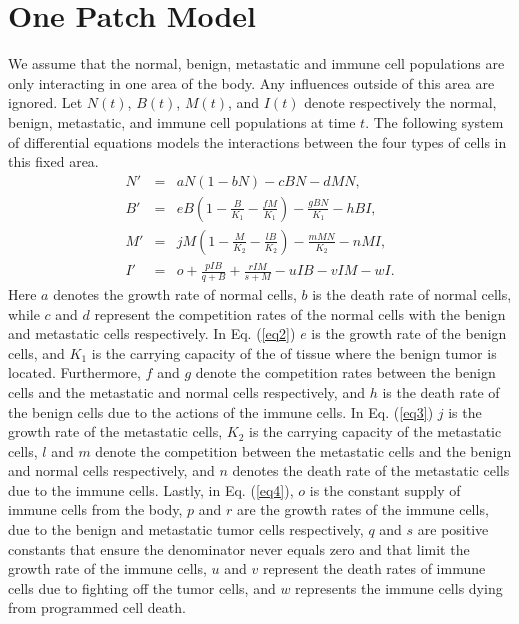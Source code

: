 \documentclass[letter,10pt]{article}
\begin{document}
\section{One Patch Model}
We assume that the normal, benign, metastatic and immune cell populations are only interacting in one area of the body. Any influences outside of this area are ignored. Let $N(t)$, $B(t)$, $M(t)$, and $I(t)$ denote respectively the normal, benign, metastatic, and immune cell populations at time $t$. The following system of differential equations models the interactions between the four types of cells in this fixed area.
\begin{eqnarray}
N'& =& aN(1-bN)-cBN-dMN, \label{eq1}\\
B' &=& eB(1-\frac{B}{K_1}-\frac{fM}{K_1})-\frac{gBN}{K_1}-hBI,\label{eq2}\\
M' &=& jM(1-\frac{M}{K_2}-\frac{lB}{K_2})-\frac{mMN}{K_2}-nMI,\label{eq3}\\
I' &=& o+\frac{pIB}{q+B}+\frac{rIM}{s+M}-uIB-vIM-wI.\label{eq4}
\end{eqnarray}
Here $a$ denotes  the growth rate of normal cells, $b$ is the  death rate of normal cells, while $c$ and $d$ represent the competition rates of the normal cells with the benign and metastatic cells respectively. In Eq. (\ref{eq2}) $e$ is the growth rate of  the benign cells, and $K_1$ is the carrying capacity of the of tissue where the benign tumor is located. Furthermore, $f$ and $g$ denote the competition rates between the benign cells and the metastatic and normal cells respectively, and $h$ is the death rate of the benign cells due to the actions of the immune cells. In Eq. (\ref{eq3}) $j$ is the growth rate of the metastatic cells, $K_2$ is the carrying capacity of the metastatic cells, $l$ and $m$ denote the competition between the metastatic cells and the benign and normal cells respectively, and $n$ denotes the death rate of the metastatic cells due to the immune cells. Lastly, in Eq. (\ref{eq4}), $o$ is the constant supply of immune cells from the body, $p$ and $r$ are the growth rates of the immune cells, due to the benign and metastatic tumor cells respectively, $q$ and $s$ are positive constants that ensure the denominator never equals zero and that limit the growth rate of the immune cells,  $u$ and $v$ represent the death rates of immune cells due to fighting off the tumor cells, and $w$ represents the immune cells dying from programmed cell death. %
\end{document}
